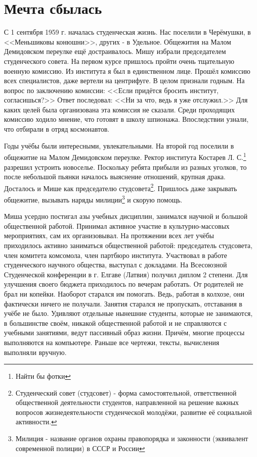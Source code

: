 ﻿\chapter{Мечта сбылась}

С 1 сентября 1959 г. началась студенческая жизнь. Нас поселили в Черёмушки, в <<Меньшиковы конюшни>>, других - в Удельное. Общежития на Малом Демидовском переулке ещё достраивалось. Мишу избрали председателем студенческого совета. На первом курсе пришлось пройти очень тщательную военную комиссию. Из института я был в единственном лице. Прошёл комиссию всех специалистов, даже вертели на центрифуге. В целом признали годным. На вопрос по заключению комиссии: <<Если придётся бросить институт, согласишься?>> Ответ последовал: <<Ни за что, ведь я уже отслужил.>> Для каких целей была организована эта комиссия не сказали. Среди проходящих комиссию ходило мнение, что готовят в школу шпионажа. Впоследствии узнали, что отбирали в отряд космонавтов.

Годы учёбы были интересными, увлекательными. На второй год поселили в общежитие на Малом Демидовском переулке. Ректор института Костарев Л. С.\footnote{Найти бы фотки} разрешил устроить новоселье. Поскольку ребята прибыли из разных уголков, то после небольшой пьянки началось выяснение отношений, крупная драка. Досталось и Мише как председателю студсовета\footnote{Студенческий совет (студсовет) - форма самостоятельной, ответственной общественной деятельности студентов, направленной на решение важных вопросов жизнедеятельности студенческой молодёжи, развитие её социальной активности.}. Пришлось даже закрывать общежитие, вызывать наряды милиции\footnote{Милиция - название органов охраны правопорядка и законности (эквивалент современной полиции) в СССР и России} и скорую помощь.

Миша усердно постигал азы учебных дисциплин, занимался научной и большой общественной работой. Принимал активное участие в культурно-массовых мероприятиях, сам их организовывал. На протяжении всех лет учёбы приходилось активно заниматься общественной работой: председатель студсовета, член комитета комсомола, член партбюро института. Участвовал в работе студенческого научного общества, выступал с докладами. На Всесоюзной Студенческой конференции в г. Елгаве (Латвия) получил диплом 2 степени. Для улучшения своего бюджета приходилось по вечерам работать. От родителей не брал ни копейки. Наоборот старался им помогать. Ведь, работая в колхозе, они фактически ничего не получали. Занятия старался не пропускать, отставания в учёбе не было. Удивляют отдельные нынешние студенты, которые не занимаются, в большинстве своём, никакой общественной работой и не справляются с учебными занятиями, ведут пассивный образ жизни. Причём, многие процессы выполняются на компьютере. Раньше все чертежи, тексты, вычисления выполняли вручную.

